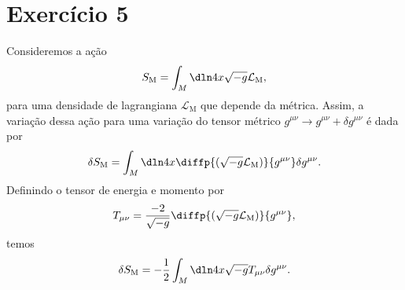 \section*{Exercício 5}

Consideremos a ação
\begin{equation*}
    S_\mathrm{M} = \int_M \dln4x\sqrt{-g}\mathcal{L}_\mathrm{M},
\end{equation*}
para uma densidade de lagrangiana \(\mathcal{L}_\mathrm{M}\) que depende da métrica. Assim, a variação dessa ação para uma variação do tensor métrico \(g^{\mu\nu} \to g^{\mu\nu} + \delta g^{\mu\nu}\) é dada por
\begin{equation*}
    \delta S_\mathrm{M} = \int_M \dln4x \diffp{(\sqrt{-g}\mathcal{L}_\mathrm{M})}{g^{\mu\nu}}\delta g^{\mu\nu}.
\end{equation*}
Definindo o tensor de energia e momento por
\begin{equation*}
    T_{\mu\nu} = \frac{-2}{\sqrt{-g}}\diffp{(\sqrt{-g}\mathcal{L}_\mathrm{M})}{g^{\mu\nu}},
\end{equation*}
temos
\begin{equation*}
    \delta S_\mathrm{M} = -\frac12\int_M\dln4x \sqrt{-g}T_{\mu\nu} \delta g^{\mu\nu}.
\end{equation*}


